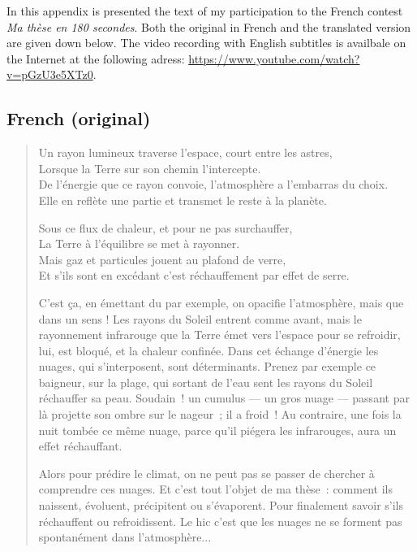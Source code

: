 \newpage
\thispagestyle{empty}
\mbox{}
\newpage

\label{annex:MT180}


In this appendix is presented the text of my participation to the French contest \textit{Ma thèse en 180 secondes}. Both the original in French and the translated version are given down below.
The video recording with English subtitles is availbale on the Internet at the following adress: \url{https://www.youtube.com/watch?v=pGzU3e5XTz0}.


    \subsection*{French (original)}
\begin{quote}    
    Un rayon lumineux traverse l’espace, court entre les astres,\\
    Lorsque la Terre sur son chemin l’intercepte.\\ 
    De l’énergie que ce rayon convoie, l’atmosphère a l’embarras du choix.\\ 
    Elle en reflète une partie et transmet le reste à la planète.\ 
    
    Sous ce flux de chaleur, et pour ne pas surchauffer,\\
    La Terre à l’équilibre se met à rayonner.\\ 
    Mais gaz et particules jouent au plafond de verre,\\ 
    Et s’ils sont en excédant c’est réchauffement par effet de serre.\
    
        C’est ça, en émettant du  par exemple, on opacifie l’atmosphère, mais que dans un sens ! Les rayons du Soleil entrent comme avant, mais le rayonnement infrarouge que la Terre émet vers l’espace pour se refroidir, lui, est bloqué, et la chaleur confinée.
    Dans cet échange d’énergie les nuages, qui s’interposent, sont déterminants. 
    Prenez par exemple ce baigneur, sur la plage, qui sortant de l’eau sent les rayons du Soleil réchauffer sa peau. Soudain ! un cumulus — un gros nuage — passant par là projette son ombre sur le nageur ; il a froid !
    Au contraire, une fois la nuit tombée ce même nuage, parce qu’il piégera les infrarouges, aura un effet réchauffant.\
    
    Alors pour prédire le climat, on ne peut pas se passer de chercher à comprendre ces nuages. Et c’est tout l’objet de ma thèse : comment ils naissent, évoluent, précipitent ou s’évaporent. Pour finalement savoir s’ils réchauffent ou refroidissent.
    Le hic c’est  que les nuages ne se forment pas spontanément dans l’atmosphère...\
    

\end{quote}
